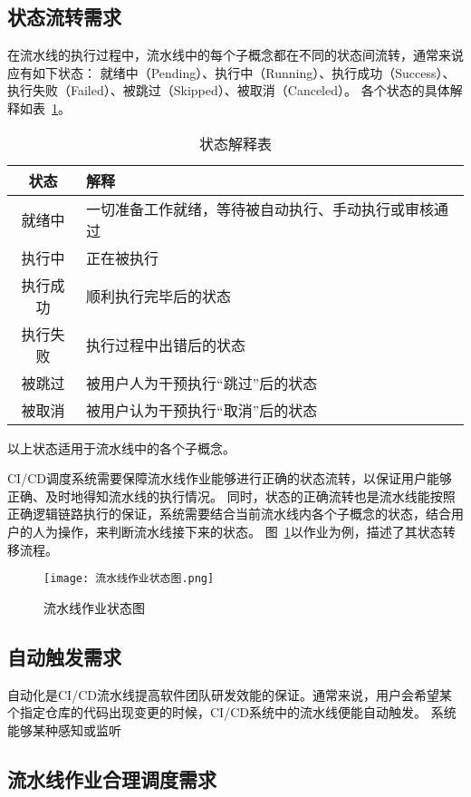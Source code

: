 \subsection{状态流转需求}
在流水线的执行过程中，流水线中的每个子概念都在不同的状态间流转，通常来说应有如下状态：
就绪中（Pending）、执行中（Running）、执行成功（Success）、执行失败（Failed）、被跳过（Skipped）、被取消（Canceled）。
各个状态的具体解释如表~\ref{tab:状态解释表}。
\begin{table}[h]
  \centering
  \caption{状态解释表}
  \label{tab:状态解释表}
  \begin{tabular}{cl}
    \toprule
    状态           & 解释                                     \\
    \midrule
    就绪中         & 一切准备工作就绪，等待被自动执行、手动执行或审核通过\\
    执行中         & 正在被执行                 \\
    执行成功       & 顺利执行完毕后的状态        \\
    执行失败       & 执行过程中出错后的状态       \\
    被跳过         & 被用户人为干预执行“跳过”后的状态         \\
    被取消         & 被用户认为干预执行“取消”后的状态         \\
    \bottomrule
  \end{tabular}
\end{table}
以上状态适用于流水线中的各个子概念。

CI/CD调度系统需要保障流水线作业能够进行正确的状态流转，以保证用户能够正确、及时地得知流水线的执行情况。
同时，状态的正确流转也是流水线能按照正确逻辑链路执行的保证，系统需要结合当前流水线内各个子概念的状态，结合用户的人为操作，来判断流水线接下来的状态。
图~\ref{fig:流水线作业状态图}以作业为例，描述了其状态转移流程。

\begin{figure}[h]
  \centering
  \texttt{[image: 流水线作业状态图.png]}
  \caption{流水线作业状态图}
  \label{fig:流水线作业状态图}
\end{figure}


\subsection{自动触发需求}
自动化是CI/CD流水线提高软件团队研发效能的保证。通常来说，用户会希望某个指定仓库的代码出现变更的时候，CI/CD系统中的流水线便能自动触发。
系统能够某种感知或监听

\subsection{流水线作业合理调度需求}

